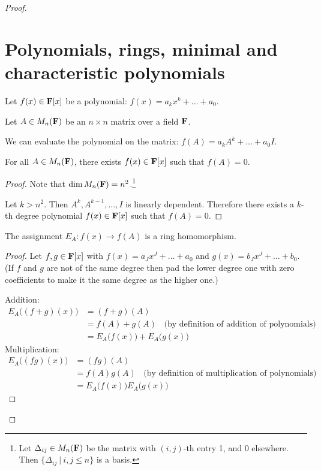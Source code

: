 \begin{proof}
\newpage
\section{Polynomials, rings, minimal and characteristic polynomials}

Let $f(x) \in \mathbf{F}[x]$ be a polynomial: $f(x) = a_kx^k + \ldots + a_0$.

Let $A \in M_n(\mathbf{F})$ be an $n \times n$ matrix over a field $\mathbf{F}$.

We can evaluate the polynomial on the matrix: $f(A) = a_kA^k + \ldots + a_0I$.

\begin{theorem*}
  For all $A \in M_n(\mathbf{F})$, there exists $f(x) \in \mathbf{F}[x]$ such that $f(A) = 0$.
\end{theorem*}

\begin{proof}
  Note that $\dim M_n(\mathbf{F}) = n^2$.\footnote{Let $\Delta_{ij} \in M_n(\mathbf{F})$ be the matrix with $(i,j)$-th entry 1, and 0
    elsewhere. Then $\{\Delta_{ij} ~|~ i,j \leq n\}$ is a basis.}

  Let $k > n^2$. Then $A^k, A^{k-1}, \ldots, I$ is linearly dependent. Therefore there exists a
  $k$-th degree polynomial $f(x) \in \mathbf{F}[x]$ such that $f(A) = 0$.
\end{proof}

\begin{theorem*}
  The assignment $E_A: f(x) \to f(A)$ is a ring homomorphism.
\end{theorem*}


\begin{proof}
  Let $f, g \in \mathbf{F}[x]$ with $f(x) = a_Jx^J + \ldots + a_0$ and $g(x) = b_Jx^J + \ldots + b_0$. (If
  $f$ and $g$ are not of the same degree then pad the lower degree one with zero coefficients to
  make it the same degree as the higher one.)

  Addition:
  \begin{align*}
    E_A\Big((f + g)(x)\Big) &= (f + g)(A)\\
                            &= f(A) + g(A)~~~~\text{(by definition of addition of polynomials)}\\
                            &= E_A\Big(f(x)\Big) + E_A\Big(g(x)\Big)
  \end{align*}
  Multiplication:
  \begin{align*}
    E_A\Big((fg)(x)\Big)    &= (fg)(A)\\
                            &= f(A)g(A)~~~~\text{(by definition of multiplication of polynomials)}\\
                            &= E_A\Big(f(x)\Big)E_A\Big(g(x)\Big)
  \end{align*}
\end{proof}


\end{proof}

